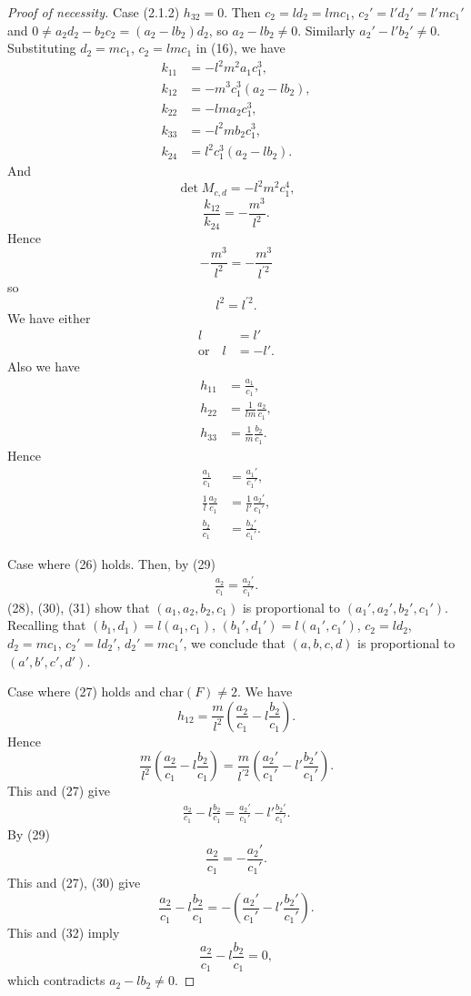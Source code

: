 \documentclass{article}
\begin{document}
\begin{proof}[Proof of necessity]
\medskip
Case (2.1.2) $h_{32}=0$. Then 
$c_2=l d_2=l m c_1$, $c_2'=l' d_2'=l' m c_1'$ and
$0\ne a_2d_2-b_2c_2=(a_2-l b_2)d_2$, 
so
$a_2-l b_2\ne 0$.
Similarly
$a_2'-l' b_2'\ne 0$.
Substituting $d_2=m c_1$, $c_2=l m c_1$ in (16),
we have 
\begin{align*}
k_{11}&=-l^2 m^2 a_1c_1^3, \\
k_{12}&=-m^3 c_1^3(a_2-l b_2),\\
k_{22}&=-l m a_2c_1^3,\\
k_{33}&=-l^2 m b_2c_1^3,\\
k_{24}&=l^2c_1^3(a_2-l b_2).
\end{align*}
And
$$
\det M_{c,d}=-l^2m^2c_1^4,
$$
$$
\frac{k_{12}}{k_{24}}=-\frac{m^3}{l^2}.
$$
Hence
$$
-\frac{m^3}{l^2}=-\frac{m^3}{l^{\prime2}}
$$
so
$$
l^2=l^{\prime 2}.
$$
We have either
\begin{align*}
l&= l' \tag{26}\\
\text{or}\quad l&=-l'. \tag{27}
\end{align*}
Also we have
\begin{align*}
h_{11}&=\frac{a_1}{c_1},\\
h_{22}&=\frac{1}{lm}\frac{a_2}{c_1},\\
h_{33}&=\frac{1}{m}\frac{b_2}{c_1}.
\end{align*}
Hence
\begin{align*}
\frac{a_1}{c_1}&=\frac{a_1'}{c_1'},\tag{28}\\
\frac{1}{l}\frac{a_2}{c_1}&=\frac{1}{l'}\frac{a_2'}{c_1'},\tag{29}\\
\frac{b_2}{c_1}&=\frac{b_2'}{c_1'}.\tag{30}
\end{align*}

Case where (26) holds. 
Then, by (29)
\begin{align*}
\frac{a_2}{c_1}=\frac{a_2'}{c_1'}. \tag{31}
\end{align*}
(28), (30), (31) show that
$(a_1,a_2,b_2,c_1)$ is proportional to $(a_1',a_2',b_2',c_1')$.
Recalling that
$(b_1,d_1)=l(a_1,c_1)$, $(b_1',d_1')=l(a_1',c_1')$, $c_2=l d_2$, $d_2=m c_1$,
$c_2'=l d_2'$, $d_2'=m c_1'$, 
we conclude that
$(a,b,c,d)$ is proportional to $(a',b',c',d')$.


Case where (27) holds and $\text{char}(F)\ne 2$.
We have
$$
h_{12}=\frac{m}{l^2}(\frac{a_2}{c_1}-l\frac{b_2}{c_1}).
$$
Hence
$$
\frac{m}{l^2}(\frac{a_2}{c_1}-l\frac{b_2}{c_1})=
\frac{m}{l^{\prime2}}(\frac{a_2'}{c_1'}-l'\frac{b_2'}{c_1'}).
$$
This and  (27) give
\begin{align*}
\frac{a_2}{c_1}-l\frac{b_2}{c_1}=\frac{a_2'}{c_1'}-l'\frac{b_2'}{c_1'}.\tag{32}
\end{align*}
By (29)
$$
\frac{a_2}{c_1}=-\frac{a_2'}{c_1'}.
$$
This and (27), (30) give
$$
\frac{a_2}{c_1}-l\frac{b_2}{c_1}=-(\frac{a_2'}{c_1'}-l'\frac{b_2'}{c_1'}).
$$
This and (32) imply
$$
\frac{a_2}{c_1}-l\frac{b_2}{c_1}=0,
$$
which contradicts $a_2-lb_2\ne 0$.


\end{proof}
\end{document}
